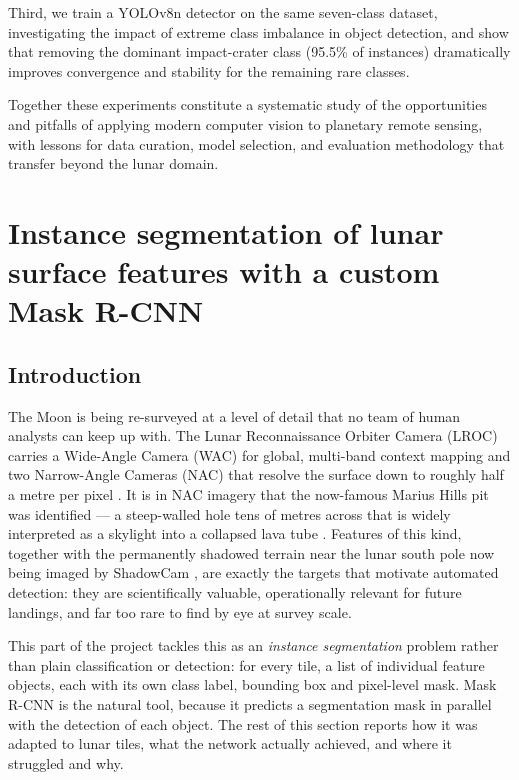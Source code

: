 \documentclass{aa}
\begin{document}
Third, we train a YOLOv8n detector on the same seven-class dataset, investigating the impact of extreme class imbalance in object detection, and show that removing the dominant impact-crater class (95.5\% of instances) dramatically improves convergence and stability for the remaining rare classes.

Together these experiments constitute a systematic study of the opportunities and pitfalls of applying modern computer vision to planetary remote sensing, with lessons for data curation, model selection, and evaluation methodology that transfer beyond the lunar domain.

\section{Instance segmentation of lunar surface features with a custom Mask R-CNN}

\subsection{Introduction}
\label{sec:intro}

The Moon is being re-surveyed at a level of detail that no team of human analysts
can keep up with. The Lunar Reconnaissance Orbiter Camera (LROC) carries a
Wide-Angle Camera (WAC) for global, multi-band context mapping and two
Narrow-Angle Cameras (NAC) that resolve the surface down to roughly half a metre
per pixel \citep{lroc_usgs}. It is in NAC imagery that the now-famous Marius Hills
pit was identified --- a steep-walled hole tens of metres across that is widely
interpreted as a skylight into a collapsed lava tube \citep{pia12954}. Features
of this kind, together with the permanently shadowed terrain near the lunar south
pole now being imaged by ShadowCam \citep{pia13523,nasa2023southpole}, are exactly
the targets that motivate automated detection: they are scientifically valuable,
operationally relevant for future landings, and far too rare to find by eye at
survey scale.

This part of the project tackles this as an \emph{instance segmentation} problem
rather than plain classification or detection: for every tile, a list of
individual feature objects, each with its own class label, bounding box and
pixel-level mask. Mask R-CNN \citep{he2017maskrcnn} is the natural tool, because it
predicts a segmentation mask in parallel with the detection of each object. The
rest of this section reports how it was adapted to lunar tiles, what the network
actually achieved, and where it struggled and why.
\end{document}
